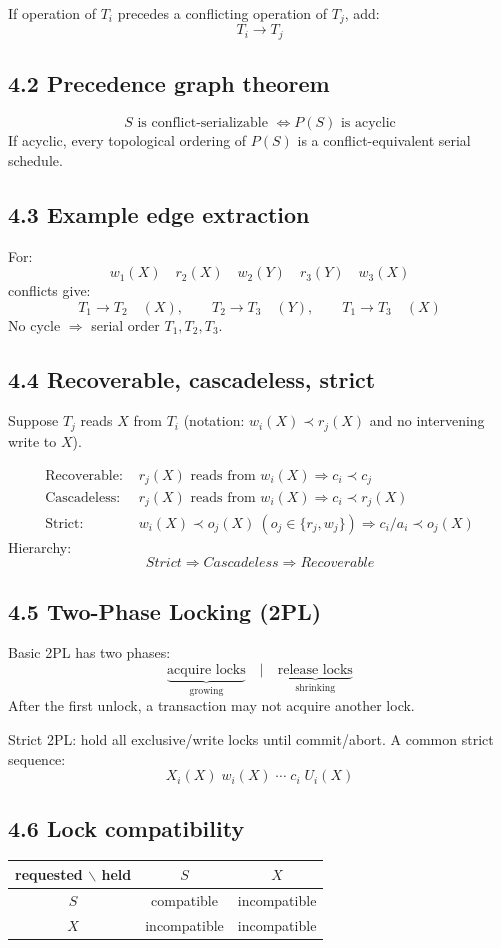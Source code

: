 \documentclass[10pt,a4paper]{article}
\begin{document}
If operation of $T_i$ precedes a conflicting operation of $T_j$, add:
\[
\boxed{T_i\to T_j}
\]

\subsection{4.2 Precedence graph theorem}
\[
\boxed{S\text{ is conflict-serializable }\Longleftrightarrow P(S)\text{ is acyclic}}
\]
If acyclic, every topological ordering of $P(S)$ is a conflict-equivalent serial schedule.

\subsection{4.3 Example edge extraction}
For:
\[
w_1(X)\quad r_2(X)\quad w_2(Y)\quad r_3(Y)\quad w_3(X)
\]
conflicts give:
\[
T_1\to T_2\quad (X),\qquad T_2\to T_3\quad (Y),\qquad T_1\to T_3\quad (X)
\]
No cycle $\Rightarrow$ serial order $T_1,T_2,T_3$.

\subsection{4.4 Recoverable, cascadeless, strict}
Suppose $T_j$ reads $X$ from $T_i$ (notation: $w_i(X)\prec r_j(X)$ and no intervening write to $X$).

\begin{align*}
\text{Recoverable: }& r_j(X)\text{ reads from }w_i(X) \Rightarrow c_i\prec c_j\\
\text{Cascadeless: }& r_j(X)\text{ reads from }w_i(X) \Rightarrow c_i\prec r_j(X)\\
\text{Strict: }& w_i(X)\prec o_j(X)\ (o_j\in\{r_j,w_j\}) \Rightarrow c_i/a_i\prec o_j(X)
\end{align*}
Hierarchy:
\[
\boxed{Strict\Rightarrow Cascadeless\Rightarrow Recoverable}
\]

\subsection{4.5 Two-Phase Locking (2PL)}
Basic 2PL has two phases:
\[
\underbrace{\text{acquire locks}}_{\text{growing}}\quad\Big|\quad\underbrace{\text{release locks}}_{\text{shrinking}}
\]
After the first unlock, a transaction may not acquire another lock.

Strict 2PL: hold all exclusive/write locks until commit/abort. A common strict sequence:
\[
X_i(X)\;w_i(X)\;\cdots\;c_i\;U_i(X)
\]

\subsection{4.6 Lock compatibility}
\begin{center}
\begin{tabular}{c|cc}
requested $\backslash$ held & $S$ & $X$\\\hline
$S$ & compatible & incompatible\\
$X$ & incompatible & incompatible
\end{tabular}
\end{center}
\end{document}
